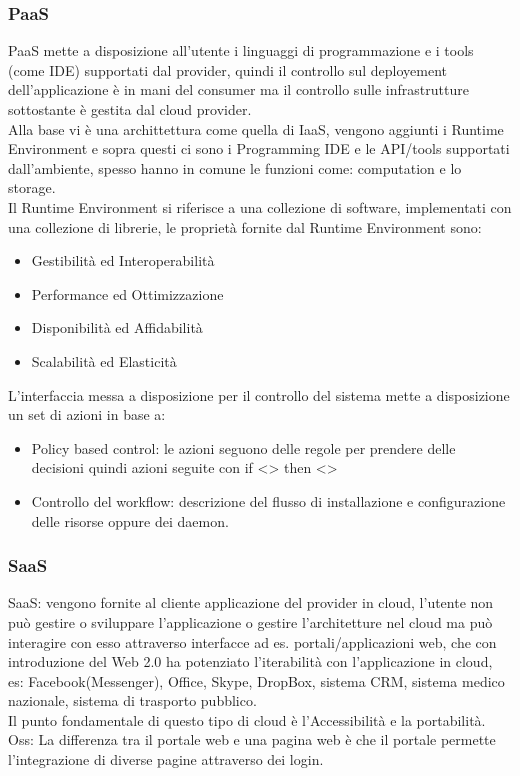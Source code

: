 \documentclass[11pt, twocolumn]{article}
\newenvironment{myitemize}
{ \begin{itemize}[topsep=0ex]
		\setlength{\itemsep}{0pt}
		\setlength{\parskip}{0pt}
		\setlength{\parsep}{0pt}     }
	{ \end{itemize}                  }
\begin{document}
\subsubsection{PaaS}
PaaS mette a disposizione all'utente i linguaggi di programmazione e i tools (come IDE) supportati dal provider, quindi il controllo sul deployement dell'applicazione è in mani del consumer ma il controllo sulle infrastrutture sottostante è gestita dal cloud provider.
\\
Alla base vi è una archittettura come quella di IaaS, vengono aggiunti i Runtime Environment e sopra questi ci sono i Programming IDE e le API/tools supportati dall'ambiente, spesso hanno in comune le funzioni come: computation e lo storage.\\
Il Runtime Environment si riferisce a una collezione di software, implementati con una collezione di librerie, le proprietà fornite dal Runtime Environment sono:
\begin{myitemize}
	\item Gestibilità ed Interoperabilità
	\item Performance ed Ottimizzazione
	\item Disponibilità ed Affidabilità
	\item Scalabilità ed Elasticità
\end{myitemize}
L'interfaccia messa a disposizione per il controllo del sistema mette a disposizione un set di azioni in base a:
\begin{itemize}
	\item Policy based control: le azioni seguono delle regole per prendere delle decisioni quindi azioni seguite con if <> then <>
	\item Controllo del workflow: descrizione del flusso di installazione e configurazione delle risorse oppure dei daemon.
\end{itemize}

\subsubsection{SaaS}
SaaS: vengono fornite al cliente applicazione del provider in cloud, l'utente non può gestire o sviluppare l'applicazione o gestire l'architetture nel cloud ma può interagire con esso attraverso interfacce ad es. portali/applicazioni web, che con introduzione del Web 2.0 ha potenziato l'iterabilità con l'applicazione in cloud, es: Facebook(Messenger), Office, Skype, DropBox, sistema CRM, sistema medico nazionale, sistema di trasporto pubblico.\\
Il punto fondamentale di questo tipo di cloud è l'Accessibilità e la portabilità.\\
Oss: La differenza tra il portale web e una pagina web è che il portale permette l'integrazione di diverse pagine attraverso dei login.
\end{document}
